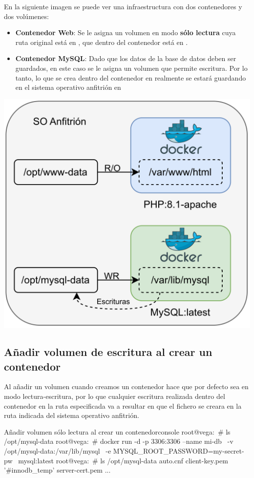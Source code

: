 En la siguiente imagen se puede ver una infraestructura con dos contenedores y dos volúmenes:
\begin{itemize}
    \item \textbf{Contenedor Web}: Se le asigna un volumen en modo \textbf{sólo lectura} cuya ruta original está en , que dentro del contenedor está en .
    \item \textbf{Contenedor MySQL}: Dado que los datos de la base de datos deben ser guardados, en este caso se le asigna un volumen que permite escritura. Por lo tanto, lo que se crea dentro del contenedor en  realmente se estará guardando en el sistema operativo anfitrión en 
\end{itemize}
\begin{center}
    \includegraphics[width=0.65\linewidth]{img/docker/volumes.png}
\end{center}


\subsection{Añadir volumen de escritura al crear un contenedor}

Al añadir un volumen cuando creamos un contenedor hace que por defecto sea en modo lectura-escritura, por lo que cualquier escritura realizada dentro del contenedor en la ruta especificada va a resultar en que el fichero se creara en la ruta indicada del sistema operativo anfitrión.

\begin{mycode}{Añadir volumen sólo lectura al crear un contenedor}{console}{{\small }}
root@vega:~# ls /opt/mysql-data
root@vega:~# docker run -d -p 3306:3306 --name mi-db \
    -v /opt/mysql-data:/var/lib/mysql \
    -e MYSQL_ROOT_PASSWORD=my-secret-pw \
    mysql:latest
root@vega:~# ls /opt/mysql-data
auto.cnf      client-key.pem      '#innodb_temp'      server-cert.pem   ...
\end{mycode}

